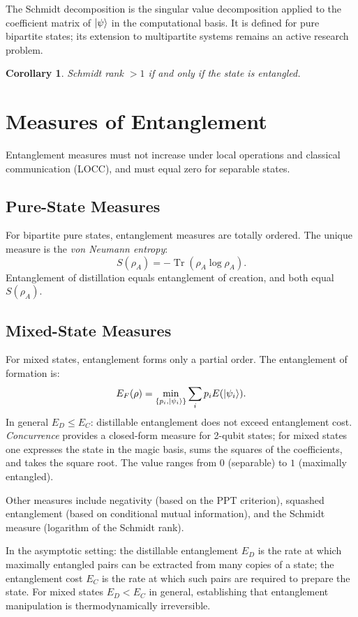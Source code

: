 \documentclass[12pt, a4paper, oneside]{report}
\theoremstyle{plain}
\newtheorem{corollary}[theorem]{Corollary}
\theoremstyle{definition}
\theoremstyle{remark}
\DeclareMathOperator{\Tr}{Tr}
\begin{document}
The Schmidt decomposition is the singular value decomposition applied to the coefficient
matrix of $\ket{\psi}$ in the computational basis. It is defined for pure bipartite states;
its extension to multipartite systems remains an active research problem.

\begin{corollary}
	Schmidt rank $> 1$ if and only if the state is entangled.
\end{corollary}

\section{Measures of Entanglement}

Entanglement measures must not increase under local operations and classical communication
(LOCC), and must equal zero for separable states.

\subsection{Pure-State Measures}

For bipartite pure states, entanglement measures are totally ordered. The unique measure is
the \emph{von Neumann entropy}:
\[
	S(\rho_A) = -\Tr(\rho_A \log \rho_A).
\]
Entanglement of distillation equals entanglement of creation, and both equal $S(\rho_A)$.

\subsection{Mixed-State Measures}

For mixed states, entanglement forms only a partial order. The entanglement of formation is:
\[
	E_F(\rho) = \min_{\{p_i,\ket{\psi_i}\}} \sum_i p_i E(\ket{\psi_i}).
\]
In general $E_D \leq E_C$: distillable entanglement does not exceed entanglement cost.
\emph{Concurrence} provides a closed-form measure for 2-qubit states; for mixed states one
expresses the state in the magic basis, sums the squares of the coefficients, and takes the
square root. The value ranges from $0$ (separable) to $1$ (maximally entangled).

Other measures include negativity (based on the PPT criterion), squashed entanglement (based
on conditional mutual information), and the Schmidt measure (logarithm of the Schmidt rank).

In the asymptotic setting: the distillable entanglement $E_D$ is the rate at which maximally
entangled pairs can be extracted from many copies of a state; the entanglement cost $E_C$ is
the rate at which such pairs are required to prepare the state. For mixed states $E_D < E_C$
in general, establishing that entanglement manipulation is thermodynamically irreversible.
\end{document}

